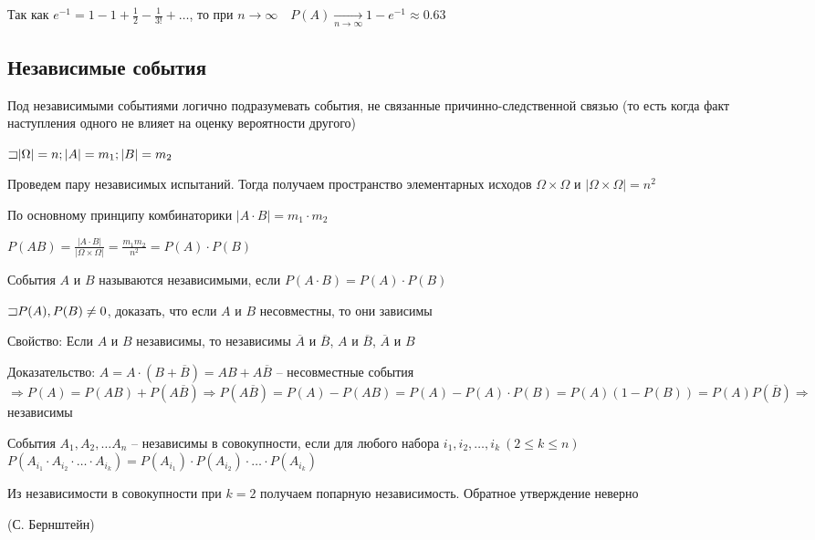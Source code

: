 \documentclass[12pt]{article}
\begin{document}
    Так как $e^{-1} = 1 - 1 + \frac{1}{2} - \frac{1}{3!} + \dots$, то при $n \to \infty \quad P(A) \underset{n \to \infty}{\to} 1 - e^{-1} \approx 0.63$

    \subsection{Независимые события}

    Под независимыми событиями логично подразумевать события, не связанные причинно-следственной связью (то есть когда факт наступления одного не влияет на оценку вероятности другого)

    $\mathord{\sqsupset} |\Omega| = n; |A| = m_1; |B| = m_2$

    Проведем пару независимых испытаний. Тогда получаем пространство элементарных исходов $\Omega \times \Omega$ и $|\Omega \times \Omega| = n^2$

    По основному принципу комбинаторики $|A \cdot B| = m_1 \cdot m_2$

    $P(AB) = \frac{|A \cdot B|}{|\Omega \times \Omega|} = \frac{m_1 m_2}{n^2} = P(A) \cdot P(B)$

    \hypertarget{independantevents}{}

    \Def События $A$ и $B$ называются независимыми, если $P(A \cdot B) = P(A) \cdot P(B)$

    \Lab $\mathord{\sqsupset} P(A), P(B) \neq 0$, доказать, что если $A$ и $B$ несовместны, то они зависимы

    Свойство: Если $A$ и $B$ независимы, то независимы $\overline{A}$ и $\overline{B}$, $A$ и $\overline{B}$, $\overline{A}$ и $B$

    Доказательство: $A = A \cdot (B + \overline{B}) = AB + A\overline{B}$ -- несовместные события $\Longrightarrow P(A) = P(AB) + P(A\overline{B}) \Longrightarrow P(A\overline{B}) = P(A) - P(AB) =
    P(A) - P(A) \cdot P(B) = P(A) (1 - P(B)) = P(A) P(\overline{B}) \Longrightarrow$ независимы

    \Def События $A_1, A_2, \dots A_n$ -- независимы в совокупности, если для любого набора $i_1, i_2, \dots, i_k \ (2 \leq k \leq n)$
    $P(A_{i_1} \cdot A_{i_2} \cdot \dots \cdot A_{i_k}) = P(A_{i_1}) \cdot P(A_{i_2}) \cdot \dots \cdot P(A_{i_k})$

    \Nota Из независимости в совокупности при $k = 2$ получаем попарную независимость. Обратное утверждение неверно

    \hypertarget{bernshteinsexample}{}

    \Ex (С. Бернштейн)
\end{document}
